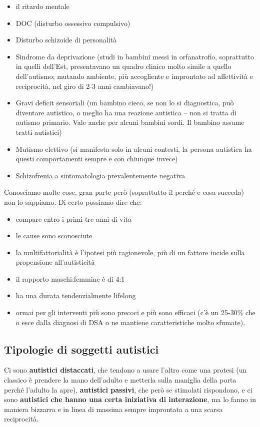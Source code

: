 \begin{itemize}
\item
  il ritardo mentale
\item
  DOC (disturbo ossessivo compulsivo)
\item
  Disturbo schizoide di personalità
\item
  Sindrome da deprivazione (studi in bambini messi in orfanatrofio,
  soprattutto in quelli dell'Est, presentavano un quadro clinico molto
  simile a quello dell'autismo; mutando ambiente, più accogliente e
  improntato ad affettività e reciprocità, nel giro di 2-3 anni
  cambiavano!)
\item
  Gravi deficit sensoriali (un bambino cieco, se non lo si diagnostica,
  può diventare autistico, o meglio ha una reazione autistica -- non si
  tratta di autismo primario. Vale anche per alcuni bambini sordi. Il
  bambino assume tratti autistici)
\item
  Mutismo elettivo (si manifesta solo in alcuni contesti, la persona
  autistica ha questi comportamenti sempre e con chiunque invece)
\item
  Schizofrenia a sintomatologia prevalentemente negativa
\end{itemize}

Conosciamo molte cose, gran parte però (soprattutto il perché e cosa
succeda) non lo sappiamo. Di certo possiamo dire che:

\begin{itemize}
\item
  compare entro i primi tre anni di vita
\item
  le cause sono sconosciute
\item
  la multifattorialità è l'ipotesi più ragionevole, più di un fattore
  incide sulla propensione all'autisticità
\item
  il rapporto maschi:femmine è di 4:1
\item
  ha una durata tendenzialmente lifelong
\item
  ormai per gli interventi più sono precoci e più sono efficaci (c'è un
  25-30\% che o esce dalla diagnosi di DSA o ne mantiene caratteristiche
  molto sfumate).
\end{itemize}

\subsection{Tipologie di soggetti autistici}

Ci sono \textbf{autistici distaccati}, che tendono a usare l'altro come
una protesi (un classico è prendere la mano dell'adulto e metterla sulla
maniglia della porta perché l'adulto la apre), \textbf{autistici
passivi}, che però se stimolati rispondono, e ci sono \textbf{autistici
che hanno una certa iniziativa di interazione}, ma lo fanno in maniera
bizzarra e in linea di massima sempre improntata a una scarsa
reciprocità.

